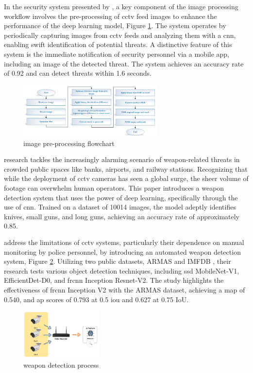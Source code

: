 In the security system presented by \citet{rfc19}, a key component of the image processing workflow involves the pre-processing of \ac{cctv} feed images to enhance the performance of the deep learning model, Figure \ref{fig:al-mousa-flow}. The system operates by periodically capturing images from \ac{cctv} feeds and analyzing them with a \ac{cnn}, enabling swift identification of potential threats. A distinctive feature of this system is the immediate notification of security personnel via a mobile app, including an image of the detected threat. The system achieves an accuracy rate of 0.92 and can detect threats within 1.6 seconds.

\begin{figure}[h]
    \centering 
    \includegraphics[width=0.65\textwidth]{figs/al-mousa-flowchart.png} 
    \caption{\citet{rfc19} image pre-processing flowchart}
    \label{fig:al-mousa-flow}
\end{figure}

\citet{rfc6} research tackles the increasingly alarming scenario of weapon-related threats in crowded public spaces like banks, airports, and railway stations. Recognizing that while the deployment of \ac{cctv} cameras has seen a global surge, the sheer volume of footage can overwhelm human operators. This paper introduces a weapon detection system that uses the power of deep learning, specifically through the use of \ac{cnn}. Trained on a dataset of 10014 images, the model adeptly identifies knives, small guns, and long guns, achieving an accuracy rate of approximately 0.85.

\citet{rfc20} address the limitations of \ac{cctv} systems, particularly their dependence on manual monitoring by police personnel, by introducing an automated weapon detection system, Figure \ref{fig:hnoohom-system}. Utilizing two public datasets, ARMAS and IMFDB \cite{rfc28}, their research tests various object detection techniques, including \ac{ssd} MobileNet-V1, EfficientDet-D0, and \ac{frcnn} Inception Resnet-V2. The study highlights the effectiveness of \ac{frcnn} Inception V2 with the ARMAS dataset, achieving a \ac{map} of 0.540, and \ac{ap} scores of 0.793 at 0.5 \ac{iou} and 0.627 at 0.75 IoU.
\begin{figure}[h]
    \centering 
    \includegraphics[width=0.37\textwidth]{figs/hnoohom-system.png} 
    \caption{\citet{rfc20} weapon detection process}
    \label{fig:hnoohom-system}
\end{figure}

